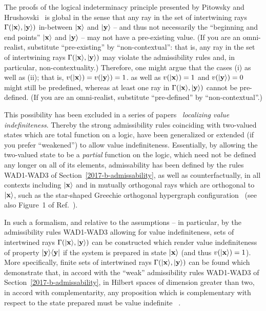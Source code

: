 The proofs of the logical indeterminacy principle
presented by  Pitowsky and Hrushovski~\cite{pitowsky:218,hru-pit-2003}
is global in the sense that any ray in the
set of intertwining rays $\Gamma ( \vert {\bf x} \rangle , \vert {\bf y} \rangle )$
in-between  $\vert {\bf x} \rangle$
and
$\vert {\bf y} \rangle$  -- and thus not necessarily the ``beginning and end points''
$\vert {\bf x} \rangle$
and
$\vert {\bf y} \rangle$
--
may not have a pre-existing value.
(If you are an omni-realist, substitute ``pre-existing'' by ``non-contextual'':
that is, any ray in the
set of intertwining rays $\Gamma ( \vert {\bf x} \rangle , \vert {\bf y} \rangle )$
may violate the admissibility rules and, in particular, non-contextuality.)
Therefore, one might argue that the cases
(i) as well as (ii); that is,
$v ( \vert {\bf x} \rangle ) = v ( \vert {\bf y} \rangle ) =1$.
as well as
$v ( \vert {\bf x} \rangle ) = 1$ and $ v ( \vert {\bf y} \rangle ) =0$
might still be predefined, whereas at least one ray in $\Gamma ( \vert {\bf x} \rangle , \vert {\bf y} \rangle )$ cannot be pre-defined.
(If you are an omni-realist, substitute ``pre-defined'' by ``non-contextual''.)


This possibility  has been excluded in a series of papers~\cite{Abbott:2010uq,2012-incomput-proofsCJ,PhysRevA.89.032109,2015-AnalyticKS}
{\em localizing value indefiniteness}.
Thereby the strong admissibility rules coinciding with two-valued states which are total function on a logic,
have been generalized or extended (if you prefer ``weakened'')
to allow value indefiniteness.
Essentially, by allowing the two-valued state to be a {\em partial} function on the logic,
which need not be defined any longer on all of its elements,
admissability has been defined by the rules WAD1-WAD3 of Section~\ref{2017-b-admissability},
as well as counterfactually, in all contexts including $\vert {\bf x} \rangle$ and in mutually orthogonal rays which are orthogonal to $\vert {\bf x} \rangle$,
such as the star-shaped Greechie orthogonal hypergraph configuration~\cite[Figure~5]{PhysRevA.89.032109} (see also Figure~1 of Ref.~\cite{svozil-2013-omelette}).


In such a formalism, and relative to the assumptions -- in particular,
by the admissibility rules WAD1-WAD3 allowing for value indefiniteness,
sets of intertwined rays  $\Gamma ( \vert {\bf x} \rangle , \vert {\bf y} \rangle )$
can be constructed
which render value indefiniteness of property $\vert {\bf y} \rangle  \langle {\bf y} \vert $
if the system is prepared in state $\vert {\bf x} \rangle$ (and thus $ v( \vert {\bf x} \rangle )=1$).
More specifically,
finite sets of intertwined rays  $\Gamma ( \vert {\bf x} \rangle , \vert {\bf y} \rangle )$
can be found which demonstrate that, in accord with the ``weak'' admissibility rules WAD1-WAD3
of Section~\ref{2017-b-admissability},
in Hilbert spaces of dimension greater than two,
in accord with complementarity,
any proposition which is complementary with respect to the state prepared
must be value indefinite ~\cite{Abbott:2010uq,2012-incomput-proofsCJ,PhysRevA.89.032109,2015-AnalyticKS}.


